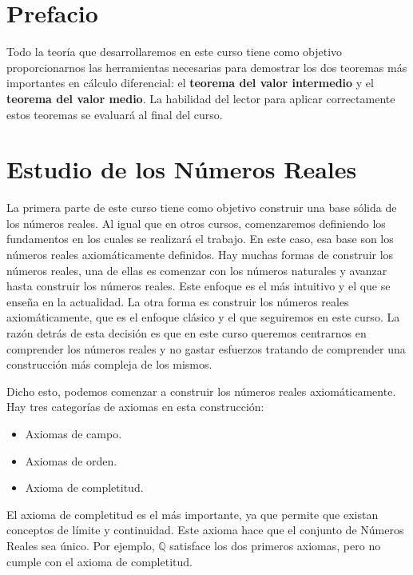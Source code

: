 \documentclass{report}
\begin{document}

    \chapter*{Prefacio}

    Todo la teoría que desarrollaremos en este curso tiene como objetivo proporcionarnos las herramientas necesarias para demostrar los dos teoremas más importantes en cálculo diferencial: el \textbf{teorema del valor intermedio} y el \textbf{teorema del valor medio}. La habilidad del lector para aplicar correctamente estos teoremas se evaluará al final del curso.

    \tableofcontents

    \pagebreak

    \chapter{Estudio de los Números Reales}

    La primera parte de este curso tiene como objetivo construir una base sólida de los números reales. Al igual que en otros cursos, comenzaremos definiendo los fundamentos en los cuales se realizará el trabajo. En este caso, esa base son los números reales axiomáticamente definidos. Hay muchas formas de construir los números reales, una de ellas es comenzar con los números naturales y avanzar hasta construir los números reales. Este enfoque es el más intuitivo y el que se enseña en la actualidad. La otra forma es construir los números reales axiomáticamente, que es el enfoque clásico y el que seguiremos en este curso. La razón detrás de esta decisión es que en este curso queremos centrarnos en comprender los números reales y no gastar esfuerzos tratando de comprender una construcción más compleja de los mismos.

    Dicho esto, podemos comenzar a construir los números reales axiomáticamente. Hay tres categorías de axiomas en esta construcción:

    \begin{itemize}
        \item Axiomas de campo.
        \item Axiomas de orden.
        \item Axioma de completitud.
    \end{itemize}

    \begin{noteBox}
        El axioma de completitud es el más importante, ya que permite que existan conceptos de límite y continuidad. Este axioma hace que el conjunto de Números Reales sea único. Por ejemplo, $\mathbb{Q}$ satisface los dos primeros axiomas, pero no cumple con el axioma de completitud.
    \end{noteBox}
\end{document}

